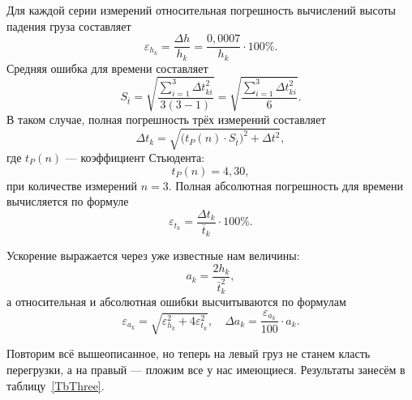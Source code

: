 Для каждой серии измерений относительная погрешность вычислений высоты падения груза составляет
\[
\varepsilon_{h_k}=\frac{\Delta h}{h_k}=\frac{0{,}0007}{h_k}\cdot100\%.
\]
Средняя ошибка для времени составляет
\[
S_{\bar t}=\sqrt{\frac{\displaystyle\sum_{i=1}^3\Delta t_{ki}^2}{3(3-1)}}=\sqrt{\frac{\displaystyle\sum_{i=1}^3\Delta t_{ki}^2}{6}}.
\]
В таком случае, полная погрешность трёх измерений составляет
\[
\Delta t_k=\sqrt{\bigl(t_P(n)\cdot S_{\bar t}\bigr)^2+\Delta t^2},
\]
где $t_P(n)$ --- коэффициент Стьюдента:
\[
t_P(n)=4{,}30,
\]
при количестве измерений $n=3$. Полная абсолютная погрешность для времени вычисляется по формуле
\[
\varepsilon_{t_k}=\frac{\Delta t_k}{\bar t_k}\cdot100\%.
\]

Ускорение выражается через уже известные нам величины:
\[
a_k=\frac{2h_k}{\bar t_k^2},
\]
а относительная и абсолютная ошибки высчитываются по формулам
\[
\varepsilon_{a_k}=\sqrt{\varepsilon_{h_k}^2+4\varepsilon_{t_k}^2},\quad\Delta a_k= \frac{\varepsilon_{a_k}}{100}\cdot a_k.
\]

Повторим всё вышеописанное, но теперь на левый груз не станем класть перегрузки, а на правый --- пложим все у нас имеющиеся. Результаты занесём в таблицу~\ref{TbThree}.

